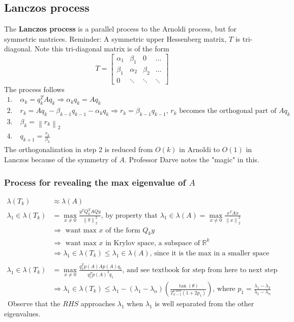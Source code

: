 \documentclass{article}
\newcommand{\norm}[2]{\left\lVert#1\right\rVert_#2}
\begin{document}
\subsection{Lanczos process}
The \textbf{Lanczos process} is a parallel process to the Arnoldi process, but for symmetric matrices. Reminder: A symmetric upper Hessenberg matrix, $T$ is tri-diagonal. Note this tri-diagonal matrix is of the form
\begin{equation*}
    T = \begin{bmatrix}
        \alpha_1 & \beta_1 & 0 & \dots\\
        \beta_1 & \alpha_2 & \beta_2 & \dots \\
        0 & \ddots & \ddots & \ddots
    \end{bmatrix}
\end{equation*}
The process follows
\begin{align*}
    1. \;& \alpha_k = q_k^TAq_k \Longrightarrow \alpha_kq_k = Aq_k\\
    2. \;& r_k = Aq_k - \beta_{k-1}q_{k-1} - \alpha_kq_k \Longrightarrow r_k = \beta_{k-1}q_{k-1} \textrm{, $r_k$ becomes the orthogonal part of $Aq_k$}\\
    3. \;& \beta_k = \norm{r_k}{2}\\
    4. \;& q_{k+1} = \frac{r_k}{\beta_k}
\end{align*}
The orthogonalization in step 2 is reduced from $O(k)$ in Arnoldi to $O(1)$ in Lanczos because of the symmetry of $A$. Professor Darve notes the "magic" in this. 

\subsubsection{Process for revealing the max eigenvalue of $A$}
\begin{align*}
    \lambda(T_k) &\approx \lambda(A)\\
    \lambda_1 \in \lambda(T_k) &= \max_{x \neq 0} \frac{y^TQ_k^TAQy}{\norm{y}{2}^2} \textrm{, by property that } \lambda_1 \in \lambda(A) = \max_{x \neq 0} \frac{x^TAx}{\norm{x}{2}^2}\\
    &\Longrightarrow \textrm{ want max $x$ of the form } Q_ky \\
    &\Longrightarrow \textrm{ want max $x$ in Krylov space, a subspace of } \mathbb{R}^k\\
    &\Longrightarrow \lambda_1 \in \lambda(T_k) \leq \lambda_1 \in \lambda(A) \textrm{, since it is the max in a smaller space} \\ \\
    \lambda_1 \in \lambda(T_k) &= \max_{x \neq 0} \frac{q_1^Tp(A)Ap(A)q_1}{q_1^Tp(A)^2q_1} \textrm{, and see textbook for step from here to next step}\\
    &\Longrightarrow \lambda_1 \in \lambda(T_k) \leq \lambda_1 - (\lambda_1-\lambda_n)(\frac{\tan(\theta)}{T_{k-1}^{Cheb}(1+2p_1)}) \textrm{, where } p_1 = \frac{\lambda_1 - \lambda_2}{\lambda_2 - \lambda_n}
\end{align*}\
Observe that the $RHS$ approaches $\lambda_1$ when $\lambda_1$ is well separated from the other eigenvalues. 
\end{document}
